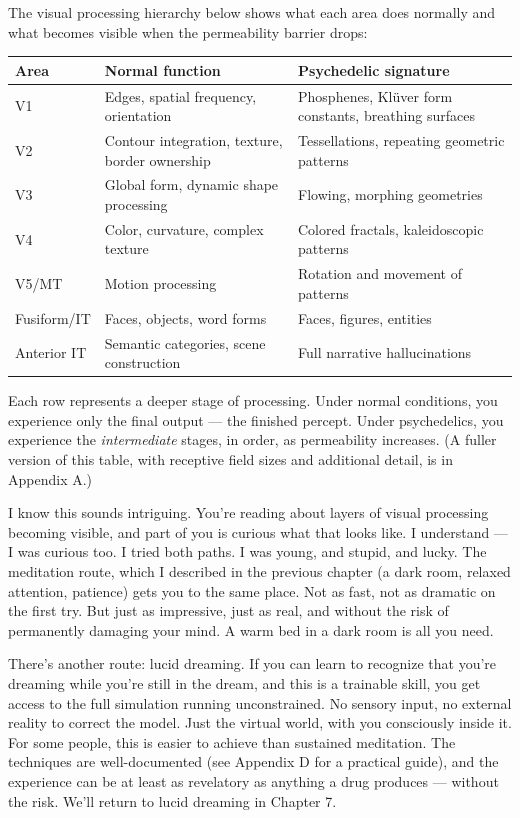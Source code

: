 \documentclass[11pt, twoside, openright]{book}
\begin{document}
The visual processing hierarchy below shows what each area does normally and what becomes visible when the permeability barrier drops:


\small
\begin{xltabular}{\linewidth}{X X X}
\toprule
\textbf{Area} & \textbf{Normal function} & \textbf{Psychedelic signature} \\
\midrule\endhead
V1 & Edges, spatial frequency, orientation & Phosphenes, Klüver form constants, breathing surfaces \\[4pt]
V2 & Contour integration, texture, border ownership & Tessellations, repeating geometric patterns \\[4pt]
V3 & Global form, dynamic shape processing & Flowing, morphing geometries \\[4pt]
V4 & Color, curvature, complex texture & Colored fractals, kaleidoscopic patterns \\[4pt]
V5/\allowbreak{}MT & Motion processing & Rotation and movement of patterns \\[4pt]
Fusiform/\allowbreak{}IT & Faces, objects, word forms & Faces, figures, entities \\[4pt]
Anterior IT & Semantic categories, scene construction & Full narrative hallucinations \\[4pt]
\bottomrule
\end{xltabular}
\normalsize


Each row represents a deeper stage of processing. Under normal conditions, you experience only the final output --- the finished percept. Under psychedelics, you experience the \textit{intermediate} stages, in order, as permeability increases. (A fuller version of this table, with receptive field sizes and additional detail, is in Appendix A.)

I know this sounds intriguing. You're reading about layers of visual processing becoming visible, and part of you is curious what that looks like. I understand --- I was curious too. I tried both paths. I was young, and stupid, and lucky. The meditation route, which I described in the previous chapter (a dark room, relaxed attention, patience) gets you to the same place. Not as fast, not as dramatic on the first try. But just as impressive, just as real, and without the risk of permanently damaging your mind. A warm bed in a dark room is all you need.

There's another route: lucid dreaming. If you can learn to recognize that you're dreaming while you're still in the dream, and this is a trainable skill, you get access to the full simulation running unconstrained. No sensory input, no external reality to correct the model. Just the virtual world, with you consciously inside it. For some people, this is easier to achieve than sustained meditation. The techniques are well-documented (see Appendix D for a practical guide), and the experience can be at least as revelatory as anything a drug produces --- without the risk. We'll return to lucid dreaming in Chapter 7.
\end{document}
